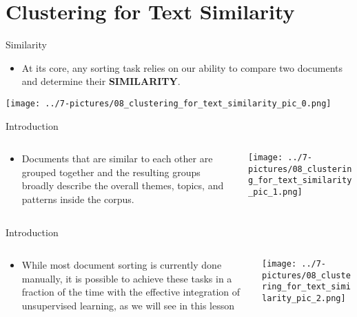 \documentclass[11pt]{beamer}
\begin{document}
\section{Clustering for Text Similarity \\ \scalebox{0.8}{Sorting Documents}}
\begin{frame}{Similarity}
	\begin{itemize}
		\item At its core, any sorting task relies on our ability to compare two documents and determine their \textbf{SIMILARITY}. 
	\end{itemize}
	\begin{center}
	\texttt{[image: ../7-pictures/08\_clustering\_for\_text\_similarity\_pic\_0.png]}
	\end{center}
\end{frame}
\begin{frame}{Introduction}
\begin{columns}[T] %
\begin{column}{.48\textwidth}
        \begin{itemize}
		\item Documents that are similar to each other are grouped together and the resulting groups broadly describe the overall themes, topics, and patterns inside the corpus.
        \end{itemize}
\end{column}%
\hfill%
\begin{column}{.48\textwidth}
        \texttt{[image: ../7-pictures/08\_clustering\_for\_text\_similarity\_pic\_1.png]}
\end{column}%
\end{columns}
\end{frame}
\begin{frame}{Introduction}
\begin{columns}[T] %
\begin{column}{.48\textwidth}
        \begin{itemize}
		\item While most document sorting is currently done manually, it is possible to achieve these tasks in a fraction of the time with the effective integration of unsupervised learning, as we will see in this lesson
        \end{itemize}
\end{column}%
\hfill%
\begin{column}{.48\textwidth}
        \texttt{[image: ../7-pictures/08\_clustering\_for\_text\_similarity\_pic\_2.png]}
\end{column}%
\end{columns}
\end{frame}
\end{document}
